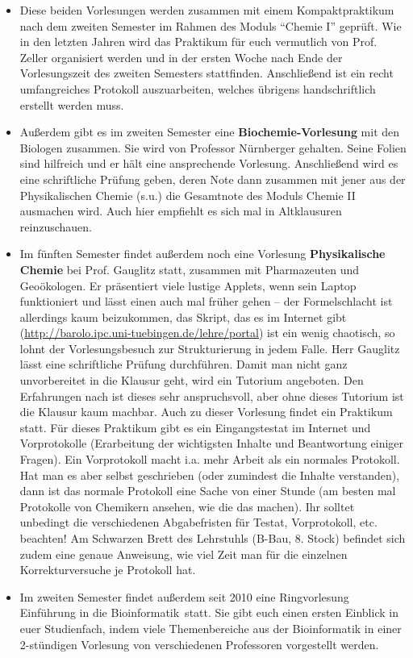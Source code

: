 \begin{itemize}
\item Diese beiden Vorlesungen werden zusammen mit einem Kompaktpraktikum nach dem
     zweiten Semester im Rahmen des Moduls "`Chemie I"' geprüft. Wie in den
     letzten Jahren wird das Praktikum für euch vermutlich von Prof. Zeller
     organisiert werden und in der ersten Woche nach Ende der Vorlesungszeit
     des zweiten Semesters stattfinden. Anschließend ist ein recht umfangreiches
     Protokoll auszuarbeiten, welches übrigens handschriftlich erstellt werden muss.

\item Außerdem gibt es im zweiten Semester eine \textbf{Biochemie-Vorlesung}
     mit den Biologen zusammen. Sie wird von Professor Nürnberger gehalten. Seine Folien sind hilfreich und er hält eine
     ansprechende Vorlesung. Anschließend wird es eine schriftliche
     Prüfung geben, deren Note dann zusammen mit jener aus der Physikalischen Chemie (s.u.)
     die Gesamtnote des Moduls Chemie II ausmachen wird. Auch hier empfiehlt es sich mal in Altklausuren reinzuschauen.


\item Im fünften Semester findet außerdem noch eine Vorlesung
     \textbf{Physikalische Chemie} bei Prof. Gauglitz statt, zusammen mit Pharmazeuten
     und Geoökologen. Er präsentiert viele lustige Applets, wenn sein Laptop
     funktioniert und lässt einen auch mal früher gehen -- der
     Formelschlacht ist allerdings kaum beizukommen, das Skript, das es im
     Internet gibt (\url{http://barolo.ipc.uni-tuebingen.de/lehre/portal}) ist ein wenig
     chaotisch, so lohnt der Vorlesungsbesuch zur Strukturierung in jedem Falle.
     Herr Gauglitz lässt eine schriftliche Prüfung durchführen. Damit man nicht ganz unvorbereitet
     in die Klausur geht, wird ein Tutorium angeboten.
     Den Erfahrungen nach ist dieses sehr anspruchsvoll, aber ohne dieses Tutorium ist die Klausur
     kaum machbar. Auch zu dieser Vorlesung findet ein Praktikum statt.
     Für dieses Praktikum gibt es ein Eingangstestat im Internet und
     Vorprotokolle (Erarbeitung der wichtigsten Inhalte und Beantwortung einiger Fragen).  Ein
     Vorprotokoll macht i.a. mehr Arbeit als ein normales Protokoll.  Hat man es aber selbst geschrieben
     (oder zumindest die Inhalte verstanden), dann ist das normale Protokoll eine Sache von einer Stunde
     (am besten mal Protokolle von Chemikern ansehen, wie die das machen). Ihr solltet unbedingt die
     verschiedenen Abgabefristen für Testat, Vorprotokoll, etc. beachten!
     Am Schwarzen Brett des Lehrstuhls (B-Bau, 8. Stock) befindet sich zudem eine genaue Anweisung, wie viel
     Zeit man für die einzelnen Korrekturversuche je Protokoll hat.

\item Im zweiten Semester findet außerdem seit 2010 eine Ringvorlesung \glqq Einführung in die Bioinformatik\grqq \ statt. Sie gibt euch einen ersten Einblick in euer Studienfach,
indem viele Themenbereiche aus der Bioinformatik in einer 2-stündigen Vorlesung von verschiedenen Professoren vorgestellt werden.

\end{itemize}

